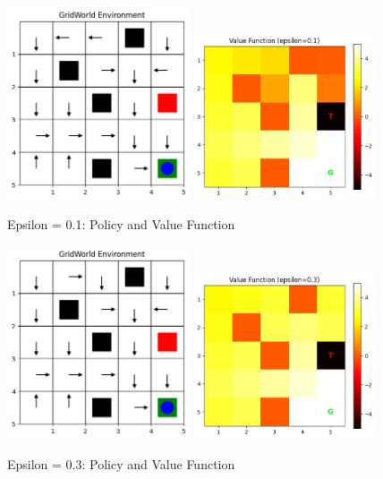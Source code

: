 \documentclass[12pt]{article}
\begin{document}
\begin{figure}[htbp]
  \centering
  \includegraphics[width=0.48\textwidth]{images/part1_q3_epsilon_0.1_policy.png}
  \includegraphics[width=0.48\textwidth]{images/part1_q3_epsilon_0.1_value.png}
  \caption{Epsilon = 0.1: Policy and Value Function}
\end{figure}

\begin{figure}[htbp]
  \centering
  \includegraphics[width=0.48\textwidth]{images/part1_q3_epsilon_0.3_policy.png}
  \includegraphics[width=0.48\textwidth]{images/part1_q3_epsilon_0.3_value.png}
  \caption{Epsilon = 0.3: Policy and Value Function}
\end{figure}
\end{document}
